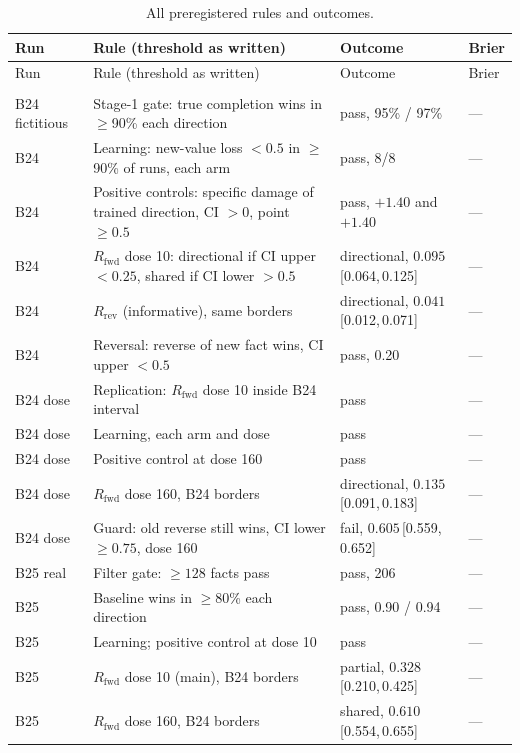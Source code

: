 \documentclass[11pt]{article}
\newcommand{\ci}[2]{\,[#1,\,#2]}
\begin{document}
\begingroup
\scriptsize
\setlength{\tabcolsep}{4pt}
\begin{longtable}{p{2.1cm}p{6.6cm}p{4.6cm}p{1.1cm}}
\caption{All preregistered rules and outcomes.}\label{tab:rules}\\
\toprule
Run & Rule (threshold as written) & Outcome & Brier \\
\midrule
\endfirsthead
\toprule
Run & Rule (threshold as written) & Outcome & Brier \\
\midrule
\endhead
\bottomrule
\endfoot
\multicolumn{4}{l}{\textit{Direction (Granite)}} \\
B24 fictitious & Stage-1 gate: true completion wins in $\ge$90\% each direction & pass, 95\% / 97\% & --- \\
B24 & Learning: new-value loss $<0.5$ in $\ge$90\% of runs, each arm & pass, 8/8 & --- \\
B24 & Positive controls: specific damage of trained direction, CI $>0$, point $\ge0.5$ & pass, $+1.40$ and $+1.40$ & --- \\
B24 & $R_{\text{fwd}}$ dose 10: directional if CI upper $<0.25$, shared if CI lower $>0.5$ & directional, $0.095$\ci{0.064}{0.125} & --- \\
B24 & $R_{\text{rev}}$ (informative), same borders & directional, $0.041$\ci{0.012}{0.071} & --- \\
B24 & Reversal: reverse of new fact wins, CI upper $<0.5$ & pass, 0.20 & --- \\
B24 dose & Replication: $R_{\text{fwd}}$ dose 10 inside B24 interval & pass & --- \\
B24 dose & Learning, each arm and dose & pass & --- \\
B24 dose & Positive control at dose 160 & pass & --- \\
B24 dose & $R_{\text{fwd}}$ dose 160, B24 borders & directional, $0.135$\ci{0.091}{0.183} & --- \\
B24 dose & Guard: old reverse still wins, CI lower $\ge0.75$, dose 160 & fail, $0.605$\ci{0.559}{0.652} & --- \\
B25 real & Filter gate: $\ge128$ facts pass & pass, 206 & --- \\
B25 & Baseline wins in $\ge$80\% each direction & pass, 0.90 / 0.94 & --- \\
B25 & Learning; positive control at dose 10 & pass & --- \\
B25 & $R_{\text{fwd}}$ dose 10 (main), B24 borders & partial, $0.328$\ci{0.210}{0.425} & --- \\
B25 & $R_{\text{fwd}}$ dose 160, B24 borders & shared, $0.610$\ci{0.554}{0.655} & --- \\

\end{longtable}
\end{document}
